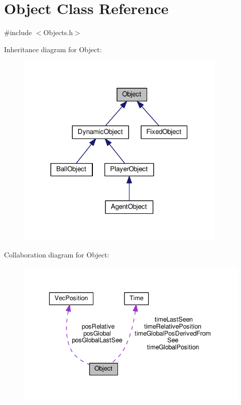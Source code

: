 \hypertarget{classObject}{}\section{Object Class Reference}
\label{classObject}


{\ttfamily \#include $<$Objects.\+h$>$}



Inheritance diagram for Object\+:
\nopagebreak
\begin{figure}[H]
\begin{center}
\leavevmode
\includegraphics[width=284pt]{classObject__inherit__graph}
\end{center}
\end{figure}


Collaboration diagram for Object\+:
\nopagebreak
\begin{figure}[H]
\begin{center}
\leavevmode
\includegraphics[width=336pt]{classObject__coll__graph}
\end{center}
\end{figure}

